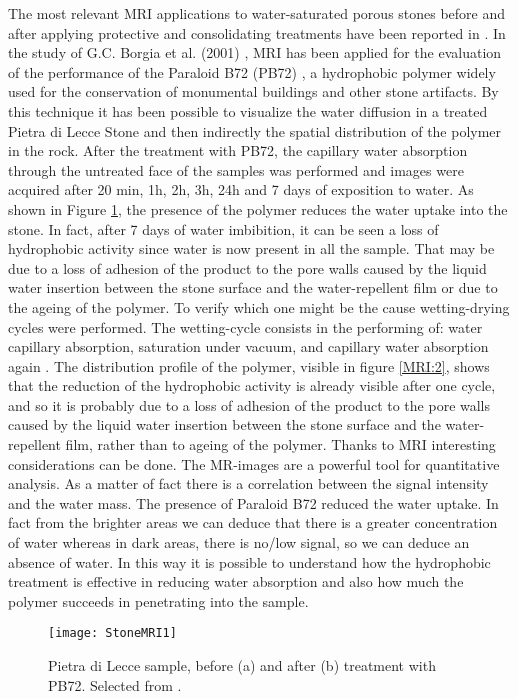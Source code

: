 \documentclass[a4paper,11pt]{report}
\begin{document}
The most relevant MRI applications to water-saturated porous stones before and after applying protective and consolidating treatments have been reported in \cite {settestone, quattrostone, quattro, trestone}. In the study of  G.C. Borgia et al. (2001) \cite{trestone} , MRI has been applied for the evaluation of the performance of the Paraloid B72 (PB72) , a hydrophobic polymer widely used for the conservation of monumental buildings and other stone artifacts. By this technique it has been possible to visualize the water diffusion in a treated Pietra di Lecce Stone and then indirectly the spatial distribution of the polymer in the rock. After the treatment with PB72, the capillary water absorption through the untreated face of the samples was performed and images were acquired after 20 min, 1h, 2h, 3h, 24h and 7 days of exposition to water. As shown in Figure \ref{MRI:1}, the presence of the polymer reduces the water uptake into the stone. In fact, after 7 days of water imbibition, it can be seen a loss of hydrophobic activity since water is now present in all the sample. That may be due to a loss of adhesion of the product to the pore walls caused by the liquid water insertion between the stone surface and the water-repellent film or due to the ageing of the polymer. To verify which one might be the cause wetting-drying cycles were performed. 
The wetting-cycle consists in the performing of: water capillary absorption, saturation under vacuum, and capillary water absorption again . The distribution profile of the polymer, visible in figure \ref{MRI:2}, shows that the reduction of the hydrophobic activity is already visible after one cycle, and so it is probably due to a loss of adhesion of the product to the pore walls caused by the liquid water insertion between the stone surface and the water-repellent film, rather than to ageing of the polymer\cite{trestone}.
Thanks to MRI interesting considerations can be done. The MR-images are a powerful tool for quantitative analysis. As a matter of fact there is a correlation between the signal intensity and the water mass. The presence of Paraloid B72 reduced the water uptake. In fact from the brighter areas we can deduce that there is a greater concentration of water whereas in dark areas, there is no/low signal, so we can deduce an absence of water. In this way it is possible to understand how the hydrophobic treatment is effective in reducing water absorption and also how much the polymer succeeds in penetrating into the sample.


\begin{figure}[h] \label{MRI:1}
\centering
\texttt{[image: StoneMRI1]}
\caption{ Pietra di Lecce sample, before (a) and after (b) treatment with PB72. Selected from \cite{trestone}.}\label{MRI:1}

\end{figure}
\end{document}
